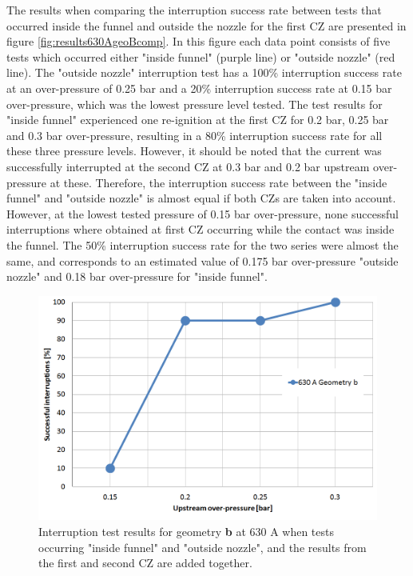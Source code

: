 \documentclass[10pt,b5paper,twoside]{article}
\begin{document}
The results when comparing the interruption success rate between tests that occurred inside the funnel and outside the nozzle for the first CZ are presented in figure \ref{fig:results630AgeoBcomp}. In this figure each data point consists of five tests which occurred either "inside funnel" (purple line) or "outside nozzle" (red line). The "outside nozzle" interruption test has a 100\% interruption success rate at an over-pressure of 0.25 bar and a 20\% interruption success rate at 0.15 bar over-pressure, which was the lowest pressure level tested. The test results for "inside funnel" experienced one re-ignition at the first CZ for 0.2 bar, 0.25 bar and 0.3 bar over-pressure, resulting in a 80\% interruption success rate for all these three pressure levels. However, it should be noted that the current was successfully interrupted at the second CZ at 0.3 bar and 0.2 bar upstream over-pressure at these. Therefore, the interruption success rate between the "inside funnel" and "outside nozzle" is almost equal if both CZs are taken into account. However, at the lowest tested pressure of 0.15 bar over-pressure, none successful interruptions where obtained at first CZ occurring while the contact was inside the funnel. The 50\% interruption success rate for the two series were almost the same, and corresponds to an estimated value of 0.175 bar over-pressure "outside nozzle" and 0.18 bar over-pressure for "inside funnel". 


\begin{figure}[H]
\centering
\includegraphics[scale=0.45]{Bilder/Results/geoB630amp.PNG}
\caption{Interruption test results for geometry \textbf{b} at 630 A when tests occurring "inside funnel" and "outside nozzle", and the results from the first and second CZ are added together.} \label{fig:results630AgeoB}
\end{figure}
\end{document}
